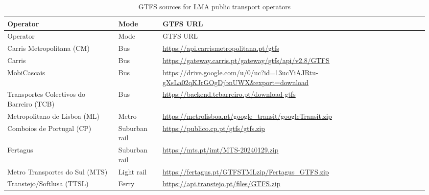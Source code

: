 \documentclass[
  authoryear,
  review,
  1p]{elsarticle}
\begin{document}
\begin{longtable}[]{@{}
  >{\raggedright\arraybackslash}p{}
  >{\raggedright\arraybackslash}p{}
  >{\raggedright\arraybackslash}p{}@{}}
\caption{GTFS sources for LMA public transport
operators}\label{tbl-gtfs_sources}\tabularnewline
\toprule\noalign{}
\begin{minipage}[b]{\linewidth}\raggedright
Operator
\end{minipage} & \begin{minipage}[b]{\linewidth}\raggedright
Mode
\end{minipage} & \begin{minipage}[b]{\linewidth}\raggedright
GTFS URL
\end{minipage} \\
\midrule\noalign{}
\endfirsthead
\toprule\noalign{}
\begin{minipage}[b]{\linewidth}\raggedright
Operator
\end{minipage} & \begin{minipage}[b]{\linewidth}\raggedright
Mode
\end{minipage} & \begin{minipage}[b]{\linewidth}\raggedright
GTFS URL
\end{minipage} \\
\midrule\noalign{}
\endhead
\bottomrule\noalign{}
\endlastfoot
Carris Metropolitana (CM) & Bus &
\url{https://api.carrismetropolitana.pt/gtfs} \\
Carris & Bus &
\url{https://gateway.carris.pt/gateway/gtfs/api/v2.8/GTFS} \\
MobiCascais & Bus &
\url{https://drive.google.com/u/0/uc?id=13ucYiAJRtu-gXsLa02qKJrGOgDjbnUWX&export=download} \\
Transportes Colectivos do Barreiro (TCB) & Bus &
\url{https://backend.tcbarreiro.pt/download-gtfs} \\
Metropolitano de Lisboa (ML) & Metro &
\url{https://metrolisboa.pt/google_transit/googleTransit.zip} \\
Comboios de Portugal (CP) & Suburban rail &
\url{https://publico.cp.pt/gtfs/gtfs.zip} \\
Fertagus & Suburban rail & \url{https://mts.pt/imt/MTS-20240129.zip} \\
Metro Transportes do Sul (MTS) & Light rail &
\url{https://fertagus.pt/GTFSTMLzip/Fertagus_GTFS.zip} \\
Transtejo/Softlusa (TTSL) & Ferry &
\url{https://api.transtejo.pt/files/GTFS.zip} \\
\end{longtable}
\end{document}
